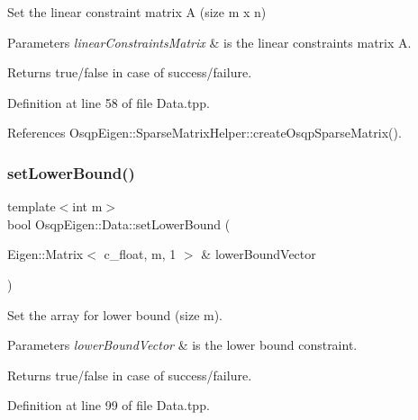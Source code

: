 Set the linear constraint matrix A (size m x n) 


\begin{DoxyParams}{Parameters}
{\em linear\+Constraints\+Matrix} & is the linear constraints matrix A. \\
\hline
\end{DoxyParams}
\begin{DoxyReturn}{Returns}
true/false in case of success/failure. 
\end{DoxyReturn}


Definition at line 58 of file Data.\+tpp.



References Osqp\+Eigen\+::\+Sparse\+Matrix\+Helper\+::create\+Osqp\+Sparse\+Matrix().

\mbox{\label{classOsqpEigen_1_1Data_a2309f26732b40ef31a639ab8d0478e18}} 
\subsubsection{\texorpdfstring{set\+Lower\+Bound()}{setLowerBound()}}
{\footnotesize\ttfamily template$<$int m$>$ \\
bool Osqp\+Eigen\+::\+Data\+::set\+Lower\+Bound (\begin{DoxyParamCaption}\item[{Eigen\+::\+Matrix$<$ c\+\_\+float, m, 1 $>$ \&}]{lower\+Bound\+Vector }\end{DoxyParamCaption})}



Set the array for lower bound (size m). 


\begin{DoxyParams}{Parameters}
{\em lower\+Bound\+Vector} & is the lower bound constraint. \\
\hline
\end{DoxyParams}
\begin{DoxyReturn}{Returns}
true/false in case of success/failure. 
\end{DoxyReturn}


Definition at line 99 of file Data.\+tpp.

\mbox{\label{classOsqpEigen_1_1Data_aea746479660e90e46fbf185dca91d936}} 

